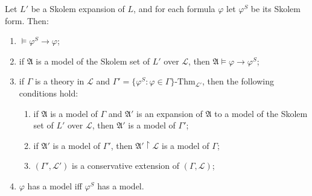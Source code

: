 Let $L'$ be a Skolem expansion of $L$, and for each formula $\varphi$ let $\varphi^S$ be its Skolem form. Then:

\begin{enumerate}
\item[(i)] $\models \varphi^S \rightarrow \varphi$;
\item[(ii)] if $\mathfrak{A}$ is a model of the Skolem set of $L'$ over $\mathcal{L}$, then $\mathfrak{A} \models \varphi \rightarrow \varphi^S$;
\item[(iii)] if $\Gamma$ is a theory in $\mathcal{L}$ and $\Gamma' = \{\varphi^S : \varphi \in \Gamma\}\text{-Thm}_{\mathcal{L}'}$, then the following conditions hold:
\begin{enumerate}
\item[(a)] if $\mathfrak{A}$ is a model of $\Gamma$ and $\mathfrak{A}'$ is an expansion of $\mathfrak{A}$ to a model of the Skolem set of $L'$ over $\mathcal{L}$, then $\mathfrak{A}'$ is a model of $\Gamma'$;
\item[(b)] if $\mathfrak{A}'$ is a model of $\Gamma'$, then $\mathfrak{A}' \upharpoonright \mathcal{L}$ is a model of $\Gamma$;
\item[(c)] $(\Gamma', \mathcal{L}')$ is a conservative extension of $(\Gamma, \mathcal{L})$;
\end{enumerate}
\item[(iv)] $\varphi$ has a model iff $\varphi^S$ has a model.
\end{enumerate}
